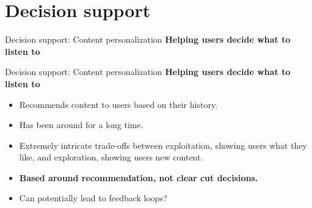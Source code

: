 \documentclass[8pt]{beamer}
\begin{document}
	\section{Decision support}

	\begin{frame}[t]{Decision support: Content personalization}
		\textbf{Helping users decide what to listen to}
		\vspace{0.3cm}
		\begin{center}
		\end{center}
	\end{frame}

	\begin{frame}[t]{Decision support: Content personalization}
		\textbf{Helping users decide what to listen to}
		\vspace{0.3cm}
		\begin{center}
		\end{center}
		\vspace{0.3cm}
		\begin{itemize}
			\item Recommends content to users based on their history.
			\item Has been around for a long time.
			\item Extremely intricate trade-offs between exploitation, showing users what they like, and exploration, showing users new content.
			\item \textbf{Based around recommendation, not clear cut decisions.}
			\item Can potentially lead to feedback loops?
		\end{itemize}
	\end{frame}
\end{document}
